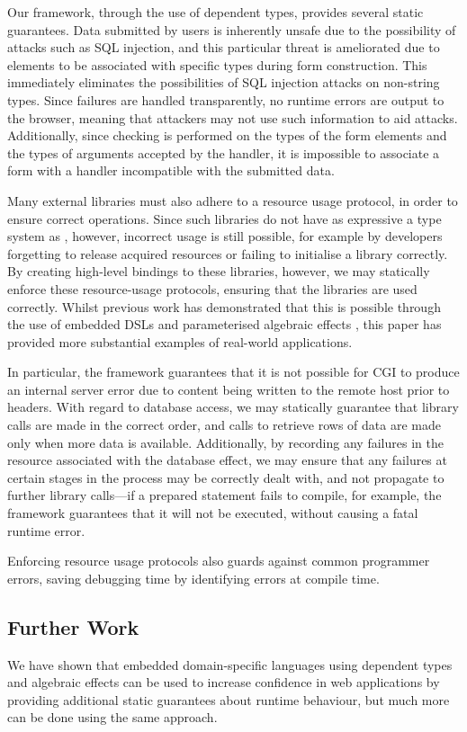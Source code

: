 \documentclass[preprint]{sigplanconf}
\begin{document}
Our framework, through the use of dependent types, provides several static guarantees. Data submitted by users is inherently unsafe due to the possibility of attacks such as SQL injection, and this particular threat is ameliorated due to elements to be associated with specific types during form construction. This immediately eliminates the possibilities of SQL injection attacks on non-string types. Since failures are handled transparently, no runtime errors are output to the browser, meaning that attackers may not use such information to aid attacks. Additionally, since checking is performed on the types of the form elements and the types of arguments accepted by the handler, it is impossible to associate a form with a handler incompatible with the submitted data.

Many external libraries must also adhere to a resource usage protocol, in order to ensure correct operations. Since such libraries do not have as expressive a type system as \idris{}, however, incorrect usage is still possible, for example by developers forgetting to release acquired resources or failing to initialise a library correctly. By creating high-level bindings to these libraries, however, we may statically enforce these resource-usage protocols, ensuring that the libraries are used correctly. Whilst previous work has demonstrated that this is possible through the use of embedded DSLs \cite{} and parameterised algebraic effects \cite{brady:effects}, this paper has provided more substantial examples of real-world applications. 

In particular, the framework guarantees that it is not possible for CGI to produce an internal server error due to content being written to the remote host prior to headers. With regard to database access, we may statically guarantee that library calls are made in the correct order, and calls to retrieve rows of data are made only when more data is available. Additionally, by recording any failures in the resource associated with the database effect, we may ensure that any failures at certain stages in the process may be correctly dealt with, and not propagate to further library calls---if a prepared statement fails to compile, for example, the framework guarantees that it will not be executed, without causing a fatal runtime error.

Enforcing resource usage protocols also guards against common programmer errors, saving debugging time by identifying errors at compile time.
\subsection{Further Work}
We have shown that embedded domain-specific languages using dependent types and algebraic effects can be used to increase confidence in web applications by providing additional static guarantees about runtime behaviour, but much more can be done using the same approach.
\end{document}
